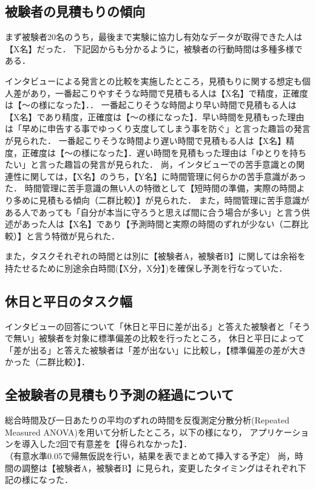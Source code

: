 \subsection{被験者の見積もりの傾向}
まず被験者20名のうち，最後まで実験に協力し有効なデータが取得できた人は【X名】だった．
下記図\label{fig:result1}からも分かるように，被験者の行動時間は多種多様である．

インタビューによる発言との比較を実施したところ，見積もりに関する想定も個人差があり，一番起こりやすそうな時間で見積もる人は【X名】で精度，正確度は【〜の様になった】．．
一番起こりそうな時間より早い時間で見積もる人は【X名】であり精度，正確度は【〜の様になった】．早い時間を見積もった理由は「早めに申告する事でゆっくり支度してしまう事を防ぐ」と言った趣旨の発言が見られた．
一番起こりそうな時間より遅い時間で見積もる人は【X名】精度，正確度は【〜の様になった】．遅い時間を見積もった理由は「ゆとりを持ちたい」と言った趣旨の発言が見られた．
尚，インタビューでの苦手意識との関連性に関しては，【X名】のうち，【Y名】に時間管理に何らかの苦手意識があった．
時間管理に苦手意識の無い人の特徴として【短時間の準備，実際の時間より多めに見積もる傾向（二群比較）】が見られた．
また，時間管理に苦手意識がある人であっても「自分が本当に守ろうと思えば間に合う場合が多い」と言う供述があった人は【X名】であり【予測時間と実際の時間のずれが少ない（二群比較）】と言う特徴が見られた．

また，タスクそれぞれの時間とは別に【被験者A，被験者B】に関しては余裕を持たせるために別途余白時間(【X分，X分】)を確保し予測を行なっていた．

\subsection{休日と平日のタスク幅}
インタビューの回答について「休日と平日に差が出る」と答えた被験者と「そうで無い」被験者を対象に標準偏差の比較を行ったところ，
休日と平日によって「差が出る」と答えた被験者は「差が出ない」に比較し，【標準偏差の差が大きかった（二群比較）】．

\subsection{全被験者の見積もり予測の経過について}
総合時間及び一日あたりの平均のずれの時間を反復測定分散分析(Repeated Measured ANOVA)を用いて分析したところ，以下の様になり，
アプリケーションを導入した2回で有意差を【得られなかった】．
\\
（有意水準0.05で帰無仮説を行い，結果を表でまとめて挿入する予定）
尚，時間の調整は【被験者A，被験者B】に見られ，変更したタイミングはそれぞれ下記の様になった．


